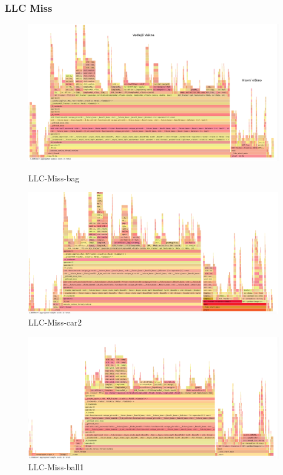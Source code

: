 \documentclass{article}
\begin{document}
\subsubsection{LLC Miss}
\begin{figure}[h!]
	\centering
	\includegraphics[width=\linewidth]{Perf/Bag/LLC-Miss-bag-whole-gimp.png}
	\caption{LLC-Miss-bag}
	\label{LLC-Miss-bag-whole}
	\vspace{0.3cm}
	\centering
	\includegraphics[width=\linewidth]{Perf/car2/LLC-Misses-car2-whole.png}
	\caption{LLC-Miss-car2}
	\label{LLC-Miss-car2-whole}
\end{figure}
\newpage
\begin{figure}[h!]
	\centering
	\includegraphics[width=\linewidth]{Perf/ball1/LLC-Misses-ball1-whole.png}
	\caption{LLC-Miss-ball1}
	\label{LLC-Miss-ball1-whole}
\end{figure}
\end{document}
